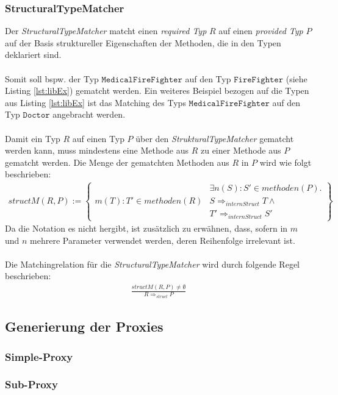 \documentclass[a4paper,12pt]{article}
\begin{document}
\subsubsection{StructuralTypeMatcher} 
Der \emph{StructuralTypeMatcher} matcht einen \emph{required Typ} $R$ auf einen \emph{provided Typ} $P$ auf der Basis struktureller Eigenschaften der Methoden, die in den Typen deklariert sind. 
\\\\
Somit soll bspw. der Typ $\texttt{MedicalFireFighter}$ auf den Typ $\texttt{FireFighter}$ (siehe Listing \ref{lst:libEx}) gematcht werden. Ein weiteres Beispiel bezogen auf die Typen aus Listing \ref{lst:libEx} ist das Matching des Typs $\texttt{MedicalFireFighter}$ auf den Typ $\texttt{Doctor}$ angebracht werden.
\\\\
Damit ein Typ $R$ auf einen Typ $P$ über den \emph{StrukturalTypeMatcher} gematcht werden kann, muss mindestens eine Methode aus $R$ zu einer Methode aus $P$ gematcht werden. Die Menge der gematchten Methoden aus $R$ in $P$ wird wie folgt beschrieben:
\begin{gather*}
structM(R,P) := \left\{ 
				\begin{array}{l|l}
						& \exists n(S):S' \in methoden(P) .\\													m(T):T' \in methoden(R) &  S\Rightarrow_{internStruct}T \wedge \\
										& T' \Rightarrow_{internStruct}S'
				\end{array}
              \right\}
\end{gather*}
Da die Notation es nicht hergibt, ist zusätzlich zu erwähnen, dass, sofern in $m$ und $n$ mehrere Parameter verwendet werden, deren Reihenfolge irrelevant ist.\\\\
Die Matchingrelation für die \emph{StructuralTypeMatcher} wird durch folgende Regel beschrieben:
\begin{gather*}
\frac{structM(R,P) \neq \emptyset}{R \Rightarrow_{struct}P}
\end{gather*}
\subsection{Generierung der Proxies}
\subsubsection{Simple-Proxy}
\subsubsection{Sub-Proxy}
\end{document}
